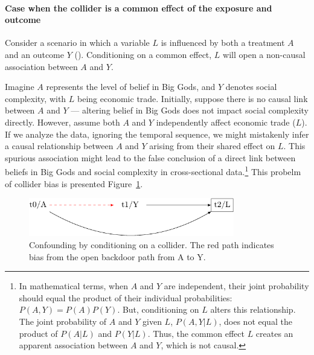 \documentclass[
  singlecolumn,
  9pt]{article}
\let\oldparagraph\paragraph
\renewcommand{\paragraph}[1]{\oldparagraph{#1}\mbox{}}
\begin{document}
\paragraph{Case when the collider is a common effect of the exposure and
outcome}\label{case-when-the-collider-is-a-common-effect-of-the-exposure-and-outcome}

Consider a scenario in which a variable \(L\) is influenced by both a
treatment \(A\) and an outcome \(Y\) (). Conditioning on a common effect, \(L\) will open a
non-causal association between \(A\) and \(Y\).

Imagine \(A\) represents the level of belief in Big Gods, and \(Y\)
denotes social complexity, with \(L\) being economic trade. Initially,
suppose there is no causal link between \(A\) and \(Y\) --- altering
belief in Big Gods does not impact social complexity directly. However,
assume both \(A\) and \(Y\) independently affect economic trade (\(L\)).
If we analyze the data, ignoring the temporal sequence, we might
mistakenly infer a causal relationship between \(A\) and \(Y\) arising
from their shared effect on \(L\). This spurious association might lead
to the false conclusion of a direct link between beliefs in Big Gods and
social complexity in cross-sectional data.\footnote{In mathematical
  terms, when \(A\) and \(Y\) are independent, their joint probability
  should equal the product of their individual probabilities:
  \(P(A, Y) = P(A)P(Y)\). But, conditioning on \(L\) alters this
  relationship. The joint probability of \(A\) and \(Y\) given \(L\),
  \(P(A, Y | L)\), does not equal the product of \(P(A | L)\) and
  \(P(Y | L)\). Thus, the common effect \(L\) creates an apparent
  association between \(A\) and \(Y\), which is not causal.} This
probelm of collider bias is presented
Figure~\ref{fig-dag-common-effect}.

\begin{figure}

{\centering \includegraphics[width=0.8\textwidth,height=\textheight]{causal-dags_files/figure-pdf/fig-dag-common-effect-1.pdf}

}

\caption{\label{fig-dag-common-effect}Confounding by conditioning on a
collider. The red path indicates bias from the open backdoor path from A
to Y.}

\end{figure}
\end{document}
